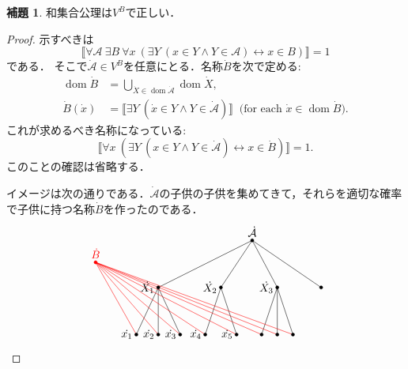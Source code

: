 \documentclass[uplatex,dvipdfmx]{jsarticle}
\newcommand{\dom}{\operatorname{dom}}
\newcommand{\truth}[1] {\llbracket #1 \rrbracket}
\theoremstyle{definition}
\newtheorem{lem}[thm]{補題}
\begin{document}
\begin{lem}
和集合公理は$V^B$で正しい．
\end{lem}
\begin{proof}
示すべきは
\[
\truth{\forall \mathcal{A}\ \exists B\ \forall x\ (\exists Y\ (x \in Y \land Y \in \mathcal{A}) \leftrightarrow x \in B)} = 1
\]
である．
そこで$\dot{\mathcal{A}} \in V^B$を任意にとる．名称$\dot{B}$を次で定める:
\begin{align*}
\dom \dot{B} &= \bigcup_{\dot{X} \in \dom \dot{\mathcal{A}}} \dom \dot{X}, \\
\dot{B}(\dot{x}) &= \truth{\exists Y\ (\dot{x} \in Y \land Y \in \dot{\mathcal{A}})}\ \text{ (for each $\dot{x} \in \dom \dot{B})$}.
\end{align*}
これが求めるべき名称になっている:
\[
\truth{\forall x\ (\exists Y\ (x \in Y \land Y \in \dot{\mathcal{A}}) \leftrightarrow x \in \dot{B})} = 1.
\]
このことの確認は省略する．

イメージは次の通りである．$\dot{\mathcal{A}}$の子供の子供を集めてきて，それらを適切な確率で子供に持つ名称$\dot{B}$を作ったのである．
\[
\begin{tikzpicture}
\draw (0,0) -- (-3,-1.5);
\draw (0,0) -- (-1,-1.5);
\draw (0,0) -- (0.8,-1.5);
\draw (0,0) -- (2.2,-1.5);

\draw (-3,-1.5) -- (-3.7,-3);
\draw (-3,-1.5) -- (-3,-3);
\draw (-3,-1.5) -- (-2.3,-3);

\draw (-1,-1.5) -- (-1.5,-3);
\draw (-1,-1.5) -- (-0.5,-3);

\draw (0.8,-1.5) -- (0.3,-3);
\draw (0.8,-1.5) -- (0.8,-3);
\draw (0.8,-1.5) -- (1.3,-3);

\draw [red,fill=red] (-5,-0.7) circle (0.05) node[above] {$\dot{B}$};
\draw [red] (-5,-0.7) -- (-3.7,-3);
\draw [red] (-5,-0.7) -- (-3,-3);
\draw [red] (-5,-0.7) -- (-2.3,-3);
\draw [red] (-5,-0.7) -- (-1.5,-3);
\draw [red] (-5,-0.7) -- (-0.5,-3);
\draw [red] (-5,-0.7) -- (0.3,-3);
\draw [red] (-5,-0.7) -- (0.8,-3);
\draw [red] (-5,-0.7) -- (1.3,-3);

\draw [fill=black] (0,0) circle (0.05) node[above] {$\dot{\mathcal{A}}$};
\draw [fill=black] (-3,-1.5) circle (0.05) node[left] {$\dot{X_1}$};
\draw [fill=black] (-1,-1.5) circle (0.05) node[left] {$\dot{X_2}$};
\draw [fill=black] (0.8,-1.5) circle (0.05) node[left] {$\dot{X_3}$};
\draw [fill=black] (2.2,-1.5) circle (0.05);

\draw [fill=black] (-3.7,-3) circle (0.05) node[left] {$\dot{x_1}$};
\draw [fill=black] (-3,-3) circle (0.05) node[left] {$\dot{x_2}$};
\draw [fill=black] (-2.3,-3) circle (0.05) node[left] {$\dot{x_3}$};
\draw [fill=black] (-1.5,-3) circle (0.05) node[left] {$\dot{x_4}$};
\draw [fill=black] (-0.5,-3) circle (0.05) node[left] {$\dot{x_5}$};
\draw [fill=black] (0.3,-3) circle (0.05);
\draw [fill=black] (0.8,-3) circle (0.05);
\draw [fill=black] (1.3,-3) circle (0.05);


\end{tikzpicture}\]
\end{proof}
\end{document}
